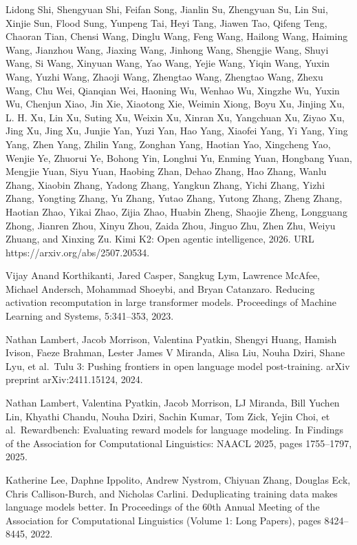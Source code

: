 \documentclass[
  10
]{article}
\begin{document}
Lidong Shi, Shengyuan Shi, Feifan Song, Jianlin Su, Zhengyuan Su, Lin
Sui, Xinjie Sun, Flood Sung, Yunpeng Tai, Heyi Tang, Jiawen Tao, Qifeng
Teng, Chaoran Tian, Chensi Wang, Dinglu Wang, Feng Wang, Hailong Wang,
Haiming Wang, Jianzhou Wang, Jiaxing Wang, Jinhong Wang, Shengjie Wang,
Shuyi Wang, Si Wang, Xinyuan Wang, Yao Wang, Yejie Wang, Yiqin Wang,
Yuxin Wang, Yuzhi Wang, Zhaoji Wang, Zhengtao Wang, Zhengtao Wang, Zhexu
Wang, Chu Wei, Qianqian Wei, Haoning Wu, Wenhao Wu, Xingzhe Wu, Yuxin
Wu, Chenjun Xiao, Jin Xie, Xiaotong Xie, Weimin Xiong, Boyu Xu, Jinjing
Xu, L. H. Xu, Lin Xu, Suting Xu, Weixin Xu, Xinran Xu, Yangchuan Xu,
Ziyao Xu, Jing Xu, Jing Xu, Junjie Yan, Yuzi Yan, Hao Yang, Xiaofei
Yang, Yi Yang, Ying Yang, Zhen Yang, Zhilin Yang, Zonghan Yang, Haotian
Yao, Xingcheng Yao, Wenjie Ye, Zhuorui Ye, Bohong Yin, Longhui Yu,
Enming Yuan, Hongbang Yuan, Mengjie Yuan, Siyu Yuan, Haobing Zhan, Dehao
Zhang, Hao Zhang, Wanlu Zhang, Xiaobin Zhang, Yadong Zhang, Yangkun
Zhang, Yichi Zhang, Yizhi Zhang, Yongting Zhang, Yu Zhang, Yutao Zhang,
Yutong Zhang, Zheng Zhang, Haotian Zhao, Yikai Zhao, Zijia Zhao, Huabin
Zheng, Shaojie Zheng, Longguang Zhong, Jianren Zhou, Xinyu Zhou, Zaida
Zhou, Jinguo Zhu, Zhen Zhu, Weiyu Zhuang, and Xinxing Zu. Kimi K2: Open
agentic intelligence, 2026. URL https://arxiv.org/abs/2507.20534.

Vijay Anand Korthikanti, Jared Casper, Sangkug Lym, Lawrence McAfee,
Michael Andersch, Mohammad Shoeybi, and Bryan Catanzaro. Reducing
activation recomputation in large transformer models. Proceedings
of Machine Learning and Systems, 5:341--353, 2023.

Nathan Lambert, Jacob Morrison, Valentina Pyatkin, Shengyi Huang, Hamish
Ivison, Faeze Brahman, Lester James V Miranda, Alisa Liu, Nouha Dziri,
Shane Lyu, et al.~Tulu 3: Pushing frontiers in open language model
post-training. arXiv preprint arXiv:2411.15124, 2024.

Nathan Lambert, Valentina Pyatkin, Jacob Morrison, LJ Miranda, Bill
Yuchen Lin, Khyathi Chandu, Nouha Dziri, Sachin Kumar, Tom Zick, Yejin
Choi, et al.~Rewardbench: Evaluating reward models for language
modeling. In Findings of the Association for Computational Linguistics:
NAACL 2025, pages 1755--1797, 2025.

Katherine Lee, Daphne Ippolito, Andrew Nystrom, Chiyuan Zhang, Douglas
Eck, Chris Callison-Burch, and Nicholas Carlini. Deduplicating training
data makes language models better. In Proceedings of the 60th
Annual Meeting of the Association for Computational Linguistics (Volume 1:
Long Papers), pages 8424--8445, 2022.
\end{document}

